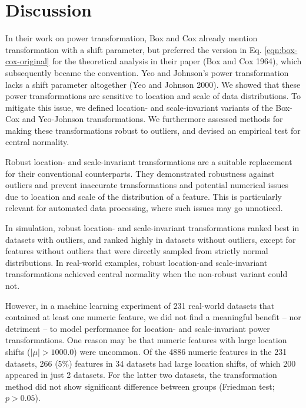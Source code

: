\documentclass[
  a4paper,
]{article}
\begin{document}
\section{Discussion}\label{discussion}

In their work on power transformation, Box and Cox already mention
transformation with a shift parameter, but preferred the version in Eq.
\ref{eqn:box-cox-original} for the theoretical analysis in their paper
(Box and Cox 1964), which subsequently became the convention. Yeo and
Johnson's power transformation lacks a shift parameter altogether (Yeo
and Johnson 2000). We showed that these power transformations are
sensitive to location and scale of data distributions. To mitigate this
issue, we defined location- and scale-invariant variants of the Box-Cox
and Yeo-Johnson transformations. We furthermore assessed methods for
making these transformations robust to outliers, and devised an
empirical test for central normality.

Robust location- and scale-invariant transformations are a suitable
replacement for their conventional counterparts. They demonstrated
robustness against outliers and prevent inaccurate transformations and
potential numerical issues due to location and scale of the distribution
of a feature. This is particularly relevant for automated data
processing, where such issues may go unnoticed.

In simulation, robust location- and scale-invariant transformations
ranked best in datasets with outliers, and ranked highly in datasets
without outliers, except for features without outliers that were
directly sampled from strictly normal distributions. In real-world
examples, robust location-and scale-invariant transformations achieved
central normality when the non-robust variant could not.

However, in a machine learning experiment of 231 real-world datasets
that contained at least one numeric feature, we did not find a
meaningful benefit -- nor detriment -- to model performance for
location- and scale-invariant power transformations. One reason may be
that numeric features with large location shifts (\(|\mu| > 1000.0\))
were uncommon. Of the 4886 numeric features in the 231 datasets, 266
(5\%) features in 34 datasets had large location shifts, of which 200
appeared in just 2 datasets. For the latter two datasets, the
transformation method did not show significant difference between groups
(Friedman test; \(p > 0.05\)).
\end{document}
